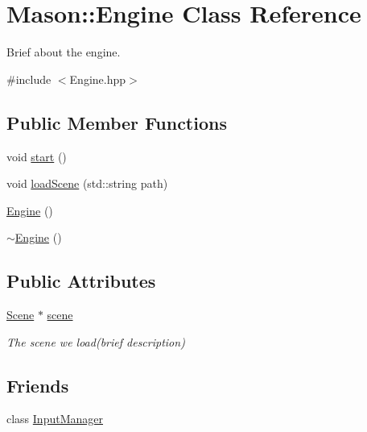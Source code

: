 \hypertarget{class_mason_1_1_engine}{}\section{Mason\+:\+:Engine Class Reference}
\label{class_mason_1_1_engine}


Brief about the engine.  




{\ttfamily \#include $<$Engine.\+hpp$>$}

\subsection*{Public Member Functions}
\begin{DoxyCompactItemize}
\item 
void \hyperlink{class_mason_1_1_engine_a4d8066dd213a03f5420d1bf60f150ca7}{start} ()
\item 
void \hyperlink{class_mason_1_1_engine_ab7f05ee3e9f917f11ed0deb20d4508b0}{load\+Scene} (std\+::string path)
\item 
\hyperlink{class_mason_1_1_engine_a8c98683b0a3aa28d8ab72a8bcd0d52f2}{Engine} ()
\item 
\hyperlink{class_mason_1_1_engine_a8ef7030a089ecb30bbfcb9e43094717a}{$\sim$\+Engine} ()
\end{DoxyCompactItemize}
\subsection*{Public Attributes}
\begin{DoxyCompactItemize}
\item 
\hyperlink{class_mason_1_1_scene}{Scene} $\ast$ \hyperlink{class_mason_1_1_engine_a2ec6bc225a9327484dde73bb8298ea85}{scene}
\begin{DoxyCompactList}\small\item\em The scene we load(brief description) \end{DoxyCompactList}\end{DoxyCompactItemize}
\subsection*{Friends}
\begin{DoxyCompactItemize}
\item 
class \hyperlink{class_mason_1_1_engine_af0e8c3dcc20b7ddcaf63506363a22821}{Input\+Manager}
\end{DoxyCompactItemize}



